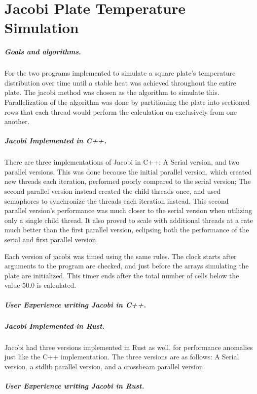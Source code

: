 \chapter{Jacobi Plate Temperature Simulation}
\paragraph{Goals and algorithms.}
For the two programs implemented to simulate a square plate's temperature
distribution over time until a stable heat was achieved throughout the
entire plate. The jacobi method was chosen as the algorithm to simulate this.
Parallelization of the algorithm was done by partitioning the plate into
sectioned rows that each thread would perform the calculation on exclusively
from one another.

\paragraph{Jacobi Implemented in C++.}
There are three implementations of Jacobi in C++: A Serial version, and two
parallel versions. This was done because the initial parallel version, which
created new threads each iteration, performed poorly compared to the serial
version; The second parallel version instead created the child threads once,
and used semaphores to synchronize the threads each iteration instead. This
second parallel version's performance was much closer to the serial version
when utilizing only a single child thread. It also proved to scale with
additional threads at a rate much better than the first parallel version,
eclipsing both the performance of the serial and first parallel version.

\par Each version of jacobi was timed using the same rules. The clock starts
after arguments to the program are checked, and just before the arrays
simulating the plate are initialized. This timer ends after the total number
of cells below the value 50.0 is calculated.

\paragraph{User Experience writing Jacobi in C++.}

\paragraph{Jacobi Implemented in Rust.}
Jacobi had three versions implemented in Rust as well, for performance anomalies
just like the C++ implementation. The three versions are as follows: A Serial
version, a stdlib parallel version, and a crossbeam parallel version.

\paragraph{User Experience writing Jacobi in Rust.}

